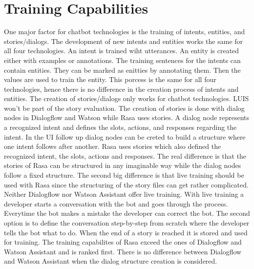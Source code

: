 \section*{Training Capabilities}
One major factor for chatbot technologies is the training of intents, entities, and stories/dialogs.
The development of new intents and entities works the same for all four technologies.
An intent is trained wiht utterances.
An entity is created either with examples or annotations.
The training sentences for the intents can contain entities.
They can be marked as enitties by annotating them.
Then the values are used to train the entity.
This porcess is the same for all four technologies, hence there is no 
difference in the creation process of intents and entities.
The creation of stories/dialogs only works for chatbot technologies.
LUIS won't be part of the story evaluation.
The creation of stories is done with dialog nodes in Dialogflow and Watson while
Rasa uses stories.
A dialog node represents a recognized intent and defines the slots, actions, and responses regarding 
the intent.
In the UI follow up dialog nodes can be creted to build a structure where one intent follows after another.
Rasa uses stories which also defined the recognized intent, the slots, actions and responses.
The real difference is that the stories of Rasa can be structured in any imaginable way while the 
dialog nodes follow a fixed structure.
The second big difference is that live training should be used with Rasa since the structuring of the story files can get 
rather complicated.
Neither Dialogflow nor Watson Assistant offer live training.
With live training a developer starts a conversation with the bot and goes through the process.
Everytime the bot makes a mistake the developer can correct the bot.
The second option is to define the conversation step-by-step from scratch where the developer tells the 
bot what to do.
When the end of a story is reached it is stored and used for training.
The training capabilites of Rasa exceed the ones of Dialogflow and Watson Assistant and is ranked first. 
There is no difference between Dialogflow and Watson Assistant when the dialog structure creation is considered.


